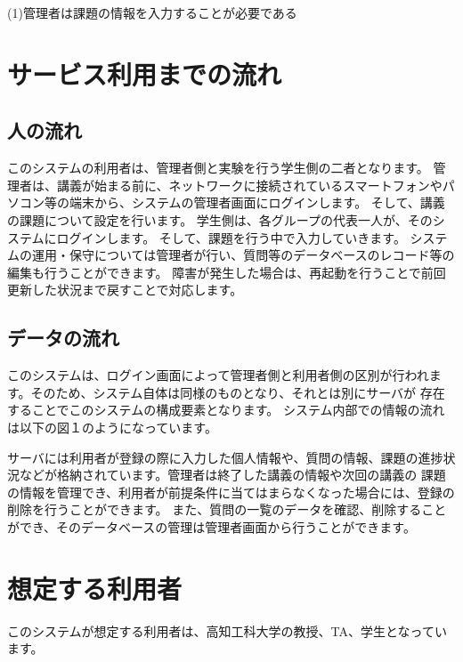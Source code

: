 \documentclass[a4j,titlepage]{ujarticle}
\begin{document}
(1)管理者は課題の情報を入力することが必要である

\section{サービス利用までの流れ}
\subsection{人の流れ}
このシステムの利用者は、管理者側と実験を行う学生側の二者となります。 %
管理者は、講義が始まる前に、ネットワークに接続されているスマートフォンやパソコン等の端末から、システムの管理者画面にログインします。
そして、講義の課題について設定を行います。
学生側は、各グループの代表一人が、そのシステムにログインします。
そして、課題を行う中で入力していきます。 %
システムの運用・保守については管理者が行い、質問等のデータベースのレコード等の編集も行うことができます。 %
障害が発生した場合は、再起動を行うことで前回更新した状況まで戻すことで対応します。 %


\subsection{データの流れ}
このシステムは、ログイン画面によって管理者側と利用者側の区別が行われます。そのため、システム自体は同様のものとなり、それとは別にサーバが %
存在することでこのシステムの構成要素となります。
システム内部での情報の流れは以下の図１のようになっています。 %

サーバには利用者が登録の際に入力した個人情報や、質問の情報、課題の進捗状況などが格納されています。管理者は終了した講義の情報や次回の講義の %
課題の情報を管理でき、利用者が前提条件に当てはまらなくなった場合には、登録の削除を行うことができます。
また、質問の一覧のデータを確認、削除することができ、そのデータベースの管理は管理者画面から行うことができます。

\section{想定する利用者}
このシステムが想定する利用者は、高知工科大学の教授、TA、学生となっています。 %
\end{document}

